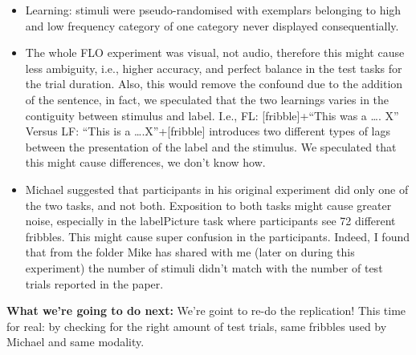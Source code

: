 \documentclass[
]{article}
\begin{document}
\begin{itemize}
\item
  Learning: stimuli were pseudo-randomised with exemplars belonging to
  high and low frequency category of one category never displayed
  consequentially.
\item
  The whole FLO experiment was visual, not audio, therefore this might
  cause less ambiguity, i.e., higher accuracy, and perfect balance in
  the test tasks for the trial duration. Also, this would remove the
  confound due to the addition of the sentence, in fact, we speculated
  that the two learnings varies in the contiguity between stimulus and
  label. I.e., FL: {[}fribble{]}+``This was a \ldots. X'' Versus LF:
  ``This is a \ldots.X''+{[}fribble{]} introduces two different types of
  lags between the presentation of the label and the stimulus. We
  speculated that this might cause differences, we don't know how.
\item
  Michael suggested that participants in his original experiment did
  only one of the two tasks, and not both. Exposition to both tasks
  might cause greater noise, especially in the labelPicture task where
  participants see 72 different fribbles. This might cause super
  confusion in the participants. Indeed, I found that from the folder
  Mike has shared with me (later on during this experiment) the number
  of stimuli didn't match with the number of test trials reported in the
  paper.
\end{itemize}

\textbf{What we're going to do next:} We're goint to re-do the
replication! This time for real: by checking for the right amount of
test trials, same fribbles used by Michael and same modality.
\end{document}
